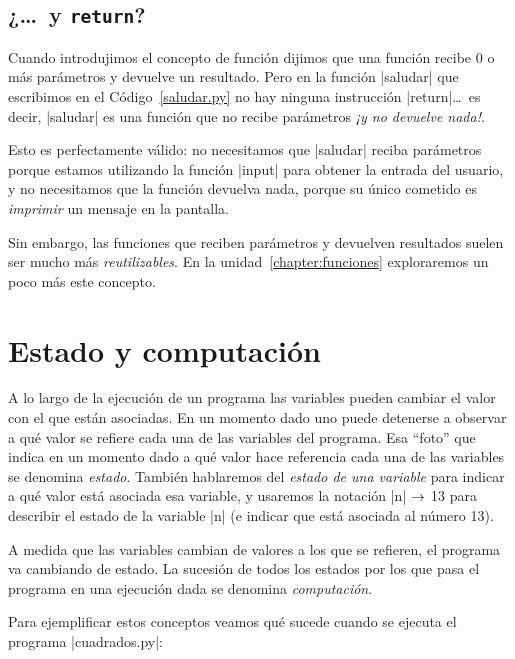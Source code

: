 \subsection*{¿\ldots\ y \verb|return|?}

Cuando introdujimos el concepto de función dijimos que una función recibe 0 o
más parámetros y devuelve un resultado. Pero en la función |saludar| que
escribimos en el Código~\ref{saludar.py} no hay ninguna instrucción
|return|\dots\ 
es decir, |saludar| es una función que no recibe parámetros \emph{¡y no devuelve
nada!}.

Esto es perfectamente válido: no necesitamos que |saludar| reciba parámetros
porque estamos utilizando la función |input| para obtener la entrada del
usuario, y no necesitamos que la función devuelva nada, porque su único
cometido es \emph{imprimir} un mensaje en la pantalla.

Sin embargo, las funciones que reciben parámetros y devuelven resultados suelen
ser mucho más \emph{reutilizables}. En la unidad~\ref{chapter:funciones}
exploraremos un poco más este concepto.

%
%
\clearpage

\section{Estado y computación}

A lo largo de la ejecución de un programa las variables pueden
cambiar el valor con el que están asociadas. En un momento dado
uno puede detenerse a observar a qué valor se refiere cada una de
las variables del programa. Esa ``foto'' que indica en un momento dado
a qué valor hace referencia cada una de las variables se denomina
\emph{estado}. También hablaremos del \emph{estado de una variable}
para indicar a qué valor está asociada esa variable, y usaremos la
notación |n| $\rightarrow$ 13 para describir el estado de la variable |n| (e indicar
que está asociada al número 13).

A medida que las variables cambian de valores a los que se
refieren, el programa va cambiando de estado. La sucesión de todos
los estados por los que pasa el programa en una ejecución dada se
denomina \emph{computación}.

Para ejemplificar estos conceptos veamos qué sucede cuando se
ejecuta el programa |cuadrados.py|:

